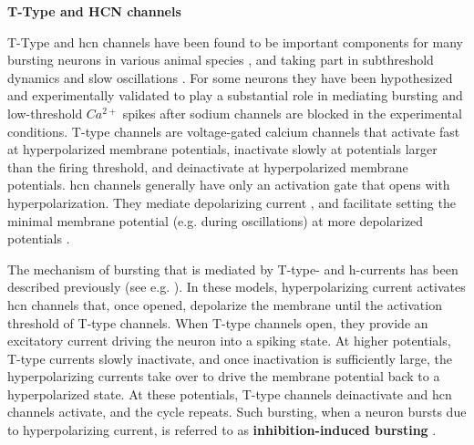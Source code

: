 \documentclass[../main.tex]{subfiles}
\begin{document}
\noindent\textbf{T-Type and HCN channels}

T-Type and \gls{hcn} channels have been found to be important components for many bursting neurons in various animal species \cite{amarilloInterplaySevenSubthreshold2014,vickstromTTypeCalciumChannels2020,destexheModelInwardCurrent1993},
and taking part in subthreshold dynamics and slow oscillations \cite{wangMultipleDynamicalModes1994}.
For some neurons they have been hypothesized and experimentally validated to play a substantial role in mediating bursting and low-threshold $Ca^{2+}$ spikes after sodium channels are blocked in the experimental conditions. %
T-type channels are voltage-gated calcium channels that activate fast at hyperpolarized membrane potentials, inactivate slowly at potentials larger than the firing threshold, and deinactivate at hyperpolarized membrane potentials. \gls{hcn} channels generally have only an activation gate that opens with hyperpolarization. They mediate depolarizing current \cite{destexheModelInwardCurrent1993}, and facilitate setting the minimal membrane potential (e.g. during oscillations) at more depolarized potentials \cite{liuMultipleConductancesCooperatively2008}.

The mechanism of bursting that is mediated by T-type- and h-currents has been described previously (see e.g. \cite{liuMultipleConductancesCooperatively2008}). In these models, hyperpolarizing current activates \gls{hcn} channels that, once opened, depolarize the membrane until the activation threshold of T-type channels. When T-type channels open, they provide an excitatory current driving the neuron into a spiking state.
At higher potentials, T-type currents slowly inactivate, and once inactivation is sufficiently large, the hyperpolarizing currents take over to drive the membrane potential back to a hyperpolarized state.
At these potentials, T-type channels deinactivate and \gls{hcn} channels activate, and the cycle repeats. Such bursting, when a neuron bursts due to hyperpolarizing current, is referred to as \textbf{inhibition-induced bursting} \cite{izhikevichDynamicalSystemsNeuroscience2006}.
\end{document}
